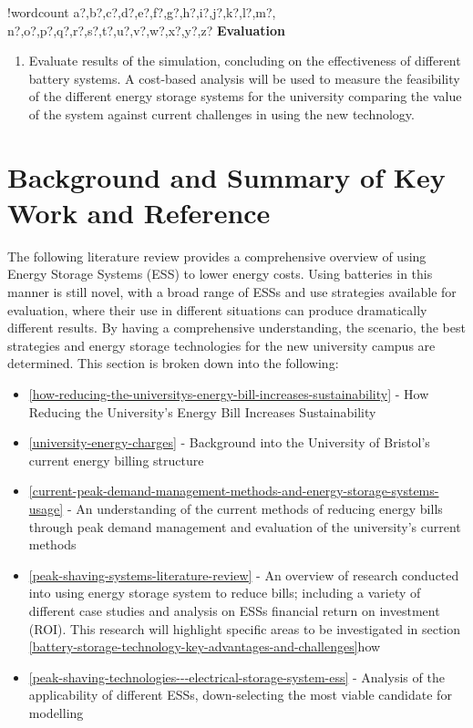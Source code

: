 \documentclass[fontsize=9.5pt]{extarticle}
\numberwithin{figure}{section} %
\providecommand{\tightlist}{%
  \setlength{\itemsep}{0pt}\setlength{\parskip}{0pt}}
\newcounter{words}
\newenvironment{counted}{%
  \setcounter{words}{0}
  \SearchList!{wordcount}{\stepcounter{words}}
    {a?,b?,c?,d?,e?,f?,g?,h?,i?,j?,k?,l?,m?,
    n?,o?,p?,q?,r?,s?,t?,u?,v?,w?,x?,y?,z?}
  \UndoBoundary{'}
  \SearchOrder{p;}}{%
  \StopSearching}
\begin{document}
\begin{counted}
\textbf{Evaluation}

\begin{enumerate}[resume]
\item Evaluate results of the simulation, concluding on the effectiveness of different battery systems. A cost-based analysis will be used to measure the feasibility of the different energy storage systems for the university comparing the value of the system against current challenges in using the new technology.
\end{enumerate}

\section{Background and Summary of Key Work and
Reference}\label{background-and-summary-of-key-work-and-reference}

The following literature review provides a comprehensive overview of
using Energy Storage Systems (ESS) to lower energy costs. Using
batteries in this manner is still novel, with a broad range of ESSs and
use strategies available for evaluation, where their use in different
situations can produce dramatically different results. By having a
comprehensive understanding, the scenario, the best strategies and
energy storage technologies for the new university campus are
determined. This section is broken down into the following:

\begin{itemize}
\tightlist
\item
  \ref{how-reducing-the-universitys-energy-bill-increases-sustainability}
  - How Reducing the University's Energy Bill Increases Sustainability
\item
  \ref{university-energy-charges} - Background into the University of
  Bristol's current energy billing structure
\item
  \ref{current-peak-demand-management-methods-and-energy-storage-systems-usage}
  - An understanding of the current methods of reducing energy bills
  through peak demand management and evaluation of the university's
  current methods
\item
  \ref{peak-shaving-systems-literature-review} - An overview of research
  conducted into using energy storage system to reduce bills; including
  a variety of different case studies and analysis on ESSs financial
  return on investment (ROI). This research will highlight specific
  areas to be investigated in section
  \ref{battery-storage-technology-key-advantages-and-challenges}how
\item
  \ref{peak-shaving-technologies---electrical-storage-system-ess} -
  Analysis of the applicability of different ESSs, down-selecting the
  most viable candidate for modelling
\end{itemize}


\end{counted}
\end{document}
